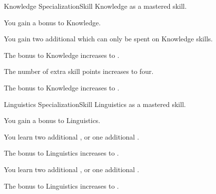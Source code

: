     \begin{feat}{Knowledge Specialization}{Skill}
        \featpre Knowledge as a mastered skill.
        \featben

         You gain a  bonus to Knowledge.

         You gain two additional  which can only be spent on Knowledge skills.

         The bonus to Knowledge increases to .

         The number of extra skill points increases to four.

         The bonus to Knowledge increases to .
    \end{feat}

    \begin{feat}{Linguistics Specialization}{Skill}
        \featpre Linguistics as a mastered skill.
        \featben

         You gain a  bonus to Linguistics.

         You learn two additional , or one additional .

         The bonus to Linguistics increases to .

         You learn two additional , or one additional .

         The bonus to Linguistics increases to .
    \end{feat}

